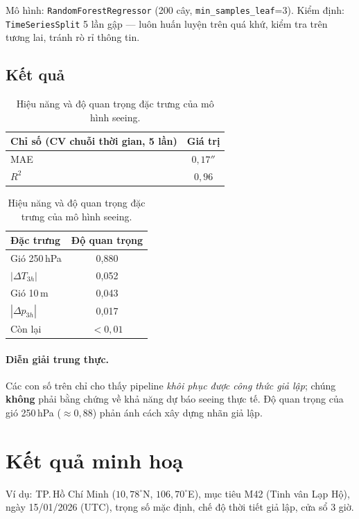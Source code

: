 \documentclass[12pt,a4paper]{article}
\newcommand{\arcsec}{\ensuremath{''}}
\begin{document}
Mô hình: \texttt{RandomForestRegressor} (200 cây, \texttt{min\_samples\_leaf}=3).
Kiểm định: \texttt{TimeSeriesSplit} 5 lần gập --- luôn huấn luyện trên quá khứ, kiểm tra trên
tương lai, tránh rò rỉ thông tin.

\subsection{Kết quả}
\begin{table}[h]
\centering
\begin{tabular}{lc}
\toprule
\textbf{Chỉ số (CV chuỗi thời gian, 5 lần)} & \textbf{Giá trị} \\
\midrule
MAE  & $0{,}17\arcsec$ \\
$R^2$ & $0{,}96$ \\
\bottomrule
\end{tabular}
\quad
\begin{tabular}{lc}
\toprule
\textbf{Đặc trưng} & \textbf{Độ quan trọng} \\
\midrule
Gió 250\,hPa & 0,880 \\
$|\Delta T_{3h}|$ & 0,052 \\
Gió 10\,m & 0,043 \\
$|\Delta p_{3h}|$ & 0,017 \\
Còn lại & $<0{,}01$ \\
\bottomrule
\end{tabular}
\caption{Hiệu năng và độ quan trọng đặc trưng của mô hình seeing.}
\end{table}

\paragraph{Diễn giải trung thực.}
Các con số trên chỉ cho thấy pipeline \emph{khôi phục được công thức giả lập}; chúng
\textbf{không} phải bằng chứng về khả năng dự báo seeing thực tế. Độ quan trọng của gió
250\,hPa ($\approx 0{,}88$) phản ánh cách xây dựng nhãn giả lập.

\section{Kết quả minh hoạ}

Ví dụ: TP.\,Hồ Chí Minh ($10{,}78^\circ$N, $106{,}70^\circ$E), mục tiêu M42 (Tinh vân Lạp Hộ),
ngày 15/01/2026 (UTC), trọng số mặc định, chế độ thời tiết giả lập, cửa sổ 3 giờ.
\end{document}
